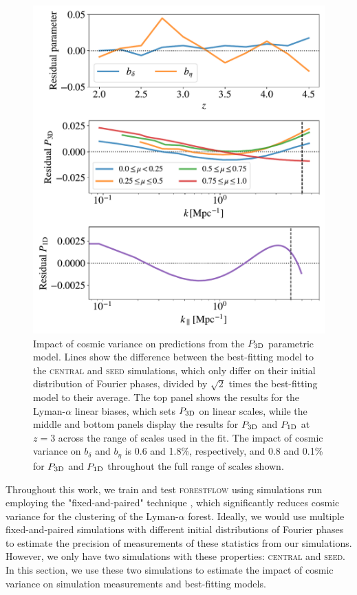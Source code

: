 \documentclass[fleqn,usenatbib]{mnras}
\newcommand{\lya}{Lyman-$\alpha$\xspace}
\newcommand{\lyaf}{Lyman-$\alpha$ forest\xspace}
\newcommand{\poned}{\ensuremath{P_{\rm 1D}}\xspace}
\newcommand{\pthreed}{\ensuremath{P_{\rm 3D}}\xspace}
\newcommand{\forestflow}{\textsc{forestflow}\xspace}
\newcommand{\simseed}{\textsc{seed}\xspace}
\newcommand{\simcentral}{\textsc{central}\xspace}
\begin{document}
\begin{figure}
\includegraphics[width=\columnwidth]{figures/cvar_fit_z_3.0.pdf}
\centering
\caption{Impact of cosmic variance on predictions from the \pthreed parametric model. Lines show the difference between the best-fitting model to the \simcentral and \simseed simulations, which only differ on their initial distribution of Fourier phases, divided by $\sqrt{2}$ times the best-fitting model to their average. The top panel shows the results for the \lya linear biases, which sets \pthreed on linear scales, while the middle and bottom panels display the results for \pthreed and \poned at $z=3$ across the range of scales used in the fit. The impact of cosmic variance on $b_\delta$ and $b_\eta$ is 0.6 and 1.8\%, respectively, and 0.8 and 0.1\% for \pthreed and \poned throughout the full range of scales shown.}
\label{fig:cvar_fit}
\end{figure}

Throughout this work, we train and test \forestflow using simulations run employing the "fixed-and-paired" technique \citep{angulo2016CosmologicalNbodySimulations, pontzen2016InvertedInitialConditions}, which significantly reduces cosmic variance for the clustering of the \lyaf \citep{anderson2019CosmologicalHydrodynamicSimulations}. Ideally, we would use multiple fixed-and-paired simulations with different initial distributions of Fourier phases to estimate the precision of measurements of these statistics from our simulations. However, we only have two simulations with these properties: \simcentral and \simseed. In this section, we use these two simulations to estimate the impact of cosmic variance on simulation measurements and best-fitting models.
\end{document}

